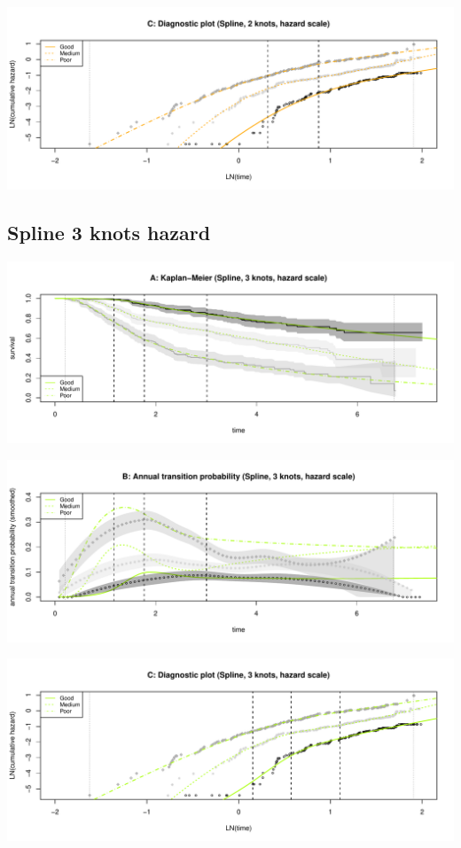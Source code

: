 \documentclass[
]{article}
\begin{document}
\begin{flushleft}\includegraphics[height=0.25\textheight]{Images/spline_hazard2-3} \end{flushleft}

\hypertarget{spline-3-knots-hazard}{%
\subsection{Spline 3 knots hazard}\label{spline-3-knots-hazard}}

\begin{flushleft}\includegraphics[height=0.25\textheight]{Images/spline_hazard3-1} \end{flushleft}

\begin{flushleft}\includegraphics[height=0.25\textheight]{Images/spline_hazard3-2} \end{flushleft}

\begin{flushleft}\includegraphics[height=0.25\textheight]{Images/spline_hazard3-3} \end{flushleft}
\end{document}
